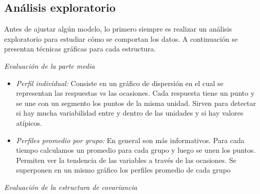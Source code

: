 \documentclass[spanish]{article}
\numberwithin{figure}{subsection}
\numberwithin{equation}{subsection}
\numberwithin{table}{subsection}
\begin{document}
\subsection{Análisis exploratorio}

Antes de ajustar algún modelo, lo primero siempre es realizar un análisis exploratorio para estudiar cómo se comportan
los datos. A continuación se presentan técnicas gráficas para cada estructura.

\textit{Evaluación de la parte media}

\begin{itemize}
	\item \textit{Perfil individual:} Consiste en un gráfico de dispersión en el cual se representan las respuestas vs las
	ocasiones. Cada respuesta tiene un punto y se une con un segmento los puntos de la misma unidad. Sirven para detectar
	si hay mucha variabilidad entre y dentro de las unidades y si hay valores atípicos.
	\item \textit{Perfiles promedio por grupo:} En general son más informativos. Para cada tiempo calculamos un promedio
	para cada grupo y luego se unen los puntos. Permiten ver la tendencia de las variables a través de las ocasiones.
	Se superponen en un mismo gráfico los perfiles promedio de cada grupo
\end{itemize}

\textit{Evaluación de la estructura de covariancia}
\end{document}
